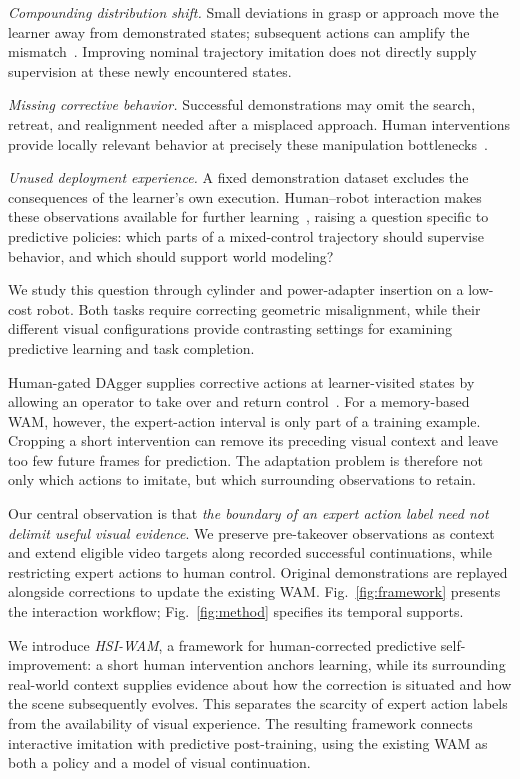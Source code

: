 \documentclass[letterpaper,10pt,conference]{ieeeconf}
\begin{document}
\textit{Compounding distribution shift.} Small deviations in grasp or approach move the learner away from demonstrated states; subsequent actions can amplify the mismatch~\cite{dagger}. Improving nominal trajectory imitation does not directly supply supervision at these newly encountered states.

\textit{Missing corrective behavior.} Successful demonstrations may omit the search, retreat, and realignment needed after a misplaced approach. Human interventions provide locally relevant behavior at precisely these manipulation bottlenecks~\cite{iwr}.

\textit{Unused deployment experience.} A fixed demonstration dataset excludes the consequences of the learner's own execution. Human--robot interaction makes these observations available for further learning~\cite{sirius}, raising a question specific to predictive policies: which parts of a mixed-control trajectory should supervise behavior, and which should support world modeling?

We study this question through cylinder and power-adapter insertion on a low-cost robot. Both tasks require correcting geometric misalignment, while their different visual configurations provide contrasting settings for examining predictive learning and task completion.

Human-gated DAgger supplies corrective actions at learner-visited states by allowing an operator to take over and return control~\cite{hgdagger}. For a memory-based WAM, however, the expert-action interval is only part of a training example. Cropping a short intervention can remove its preceding visual context and leave too few future frames for prediction. The adaptation problem is therefore not only which actions to imitate, but which surrounding observations to retain.

Our central observation is that \emph{the boundary of an expert action label need not delimit useful visual evidence}. We preserve pre-takeover observations as context and extend eligible video targets along recorded successful continuations, while restricting expert actions to human control. Original demonstrations are replayed alongside corrections to update the existing WAM. Fig.~\ref{fig:framework} presents the interaction workflow; Fig.~\ref{fig:method} specifies its temporal supports.

We introduce \emph{HSI-WAM}, a framework for human-corrected predictive self-improvement: a short human intervention anchors learning, while its surrounding real-world context supplies evidence about how the correction is situated and how the scene subsequently evolves. This separates the scarcity of expert action labels from the availability of visual experience. The resulting framework connects interactive imitation with predictive post-training, using the existing WAM as both a policy and a model of visual continuation.
\end{document}
